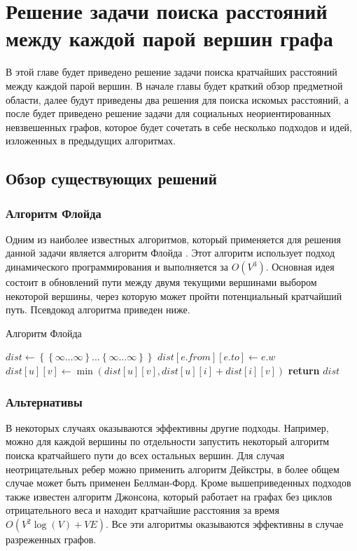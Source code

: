 \chapter{Решение задачи поиска расстояний между каждой парой вершин графа}

В этой главе будет приведено решение задачи поиска кратчайших расстояний между каждой парой вершин. В начале главы будет краткий обзор предметной области, далее будут приведены два решения для поиска искомых расстояний, а после будет приведено решение задачи для социальных неориентированных невзвешенных графов, которое будет сочетать в себе несколько подходов и идей, изложенных в предыдущих алгоритмах. 

\FloatBarrier
\section{Обзор существующих решений}

\subsection{Алгоритм Флойда}
Одним из наиболее известных алгоритмов, который применяется для решения данной задачи является алгоритм Флойда \cite{CORMEN}. Этот алгоритм использует подход динамического программирования и выполняется за $O(V^3)$. Основная идея состоит в обновлений пути между двумя текущими вершинами выбором некоторой вершины, через которую может пройти потенциальный кратчайший путь. Псевдокод алгоритма приведен ниже. 

\FloatBarrier
\begin{algorithm}
\caption{Алгоритм Флойда}\label{floyd}
\begin{algorithmic}[1]
\State $dist\gets \left\{ {   \left\{ {\infty \ldots \infty}\right\}  \ldots \left\{ {\infty \ldots \infty}\right\} }\right\}$
	\State $dist[e.from][e.to] \gets e.w$
\EndFor 
\State
{}
			\State $dist[u][v] \gets \min(dist[u][v], dist[u][i] + dist[i][v])$
		\EndFor
	\EndFor
\EndFor
\State \textbf{return} $dist$
\EndProcedure
\end{algorithmic}
\end{algorithm}

\FloatBarrier
\subsection{Альтернативы}
В некоторых случаях оказываются эффективны другие подходы. Например, можно для каждой вершины по отдельности запустить некоторый алгоритм поиска кратчайшего пути до всех остальных вершин. Для случая неотрицательных ребер можно применить алгоритм Дейкстры, в более общем случае может быть применен Беллман-Форд. Кроме вышеприведенных подходов также известен алгоритм Джонсона, который работает на графах без циклов отрицательного веса и находит кратчайшие расстояния за время $O(V^2 \log(V) + VE)$. Все эти алгоритмы оказываются эффективны в случае разреженных графов.

